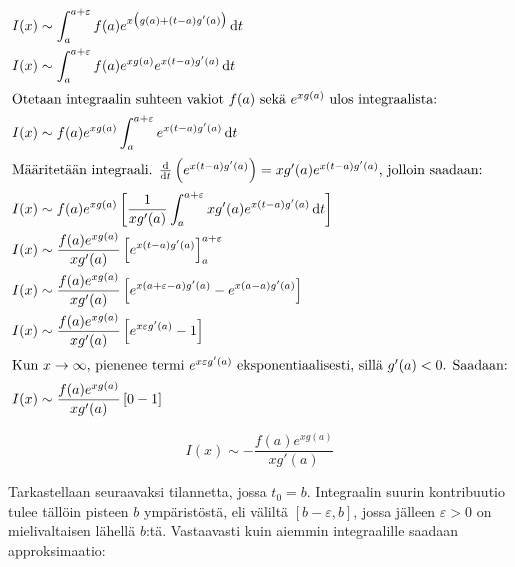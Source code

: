\documentclass[]{article}
\numberwithin{equation}{section}
\begin{document}
\begin{align}
	I(x) &\sim \int_{a}^{a + \varepsilon}f(a)e^{x\big(g(a) + (t - a)g'(a)\big)}\odif{t} \\
	I(x) &\sim \int_{a}^{a + \varepsilon}f(a)e^{xg(a)}e^{x(t - a)g'(a)}\odif{t} \\
	\intertext{Otetaan integraalin suhteen vakiot $f(a)$ sekä $e^{xg(a)}$ ulos integraalista:}
	I(x) &\sim f(a)e^{xg(a)}\int_{a}^{a + \varepsilon}e^{x(t - a)g'(a)}\odif{t} \\
	\intertext{Määritetään integraali. $\odv{}{t}\left(e^{x(t - a)g'(a)}\right) = xg'(a)e^{x(t - a)g'(a)}$, jolloin saadaan:}
	I(x) &\sim f(a)e^{xg(a)}\left[\frac{1}{xg'(a)}\int_{a}^{a + \varepsilon}xg'(a)e^{x(t - a)g'(a)}\odif{t}\right] \\
	I(x) &\sim \frac{f(a)e^{xg(a)}}{xg'(a)}\left[e^{x(t - a)g'(a)}\right]_{a}^{a + \varepsilon} \\
	I(x) &\sim \frac{f(a)e^{xg(a)}}{xg'(a)}\left[e^{x(a + \varepsilon - a)g'(a)} - e^{x(a - a)g'(a)}\right] \\
	I(x) &\sim \frac{f(a)e^{xg(a)}}{xg'(a)}\left[e^{x\varepsilon g'(a)} - 1\right] \\
	\intertext{Kun $x \to \infty$, pienenee termi $e^{x\varepsilon g'(a)}$ eksponentiaalisesti, sillä $g'(a) < 0$. Saadaan:}
	I(x) &\sim \frac{f(a)e^{xg(a)}}{xg'(a)}\left[0 - 1\right]
\end{align}

\begin{equation}
	\boxed{I(x) \sim -\frac{f(a)e^{xg(a)}}{xg'(a)}}
\end{equation}


Tarkastellaan seuraavaksi tilannetta, jossa $t_0 = b$. Integraalin suurin kontribuutio tulee tällöin pisteen $b$ ympäristöstä, eli väliltä $[b - \varepsilon, b]$, jossa jälleen $\varepsilon > 0$ on mielivaltaisen lähellä $b$:tä. Vastaavasti kuin aiemmin integraalille saadaan approksimaatio:
\end{document}
